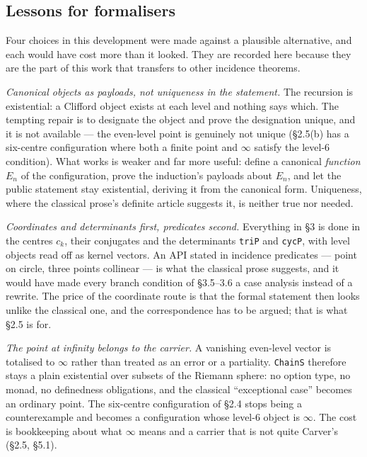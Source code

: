 \documentclass[11pt]{article}
\theoremstyle{definition}
\theoremstyle{remark}
\begin{document}
\hypertarget{lessons-for-formalisers}{%
\subsection{Lessons for formalisers}\label{lessons-for-formalisers}}

Four choices in this development were made against a plausible alternative, and each would have cost more
than it looked. They are recorded here because they are the part of this work that transfers to other
incidence theorems.

\emph{Canonical objects as payloads, not uniqueness in the statement.} The recursion is existential: a Clifford
object exists at each level and nothing says which. The tempting repair is to designate the object and
prove the designation unique, and it is not available --- the even-level point is genuinely not unique
(\S{}2.5(b) has a six-centre configuration where both a finite point and $\infty$ satisfy the level-6 condition).
What works is weaker and far more useful: define a canonical \emph{function} \(E_n\) of the configuration, prove
the induction's payloads about \(E_n\), and let the public statement stay existential, deriving it from the
canonical form. Uniqueness, where the classical prose's definite article suggests it, is neither true nor
needed.

\emph{Coordinates and determinants first, predicates second.} Everything in \S{}3 is done in the centres \(c_k\),
their conjugates and the determinants \texttt{triP} and \texttt{cycP}, with level objects read off as kernel vectors. An
API stated in incidence predicates --- point on circle, three points collinear --- is what the classical prose
suggests, and it would have made every branch condition of \S{}3.5--3.6 a case analysis instead of a rewrite.
The price of the coordinate route is that the formal statement then looks unlike the classical one, and
the correspondence has to be argued; that is what \S{}2.5 is for.

\emph{The point at infinity belongs to the carrier.} A vanishing even-level vector is totalised to $\infty$ rather
than treated as an error or a partiality. \texttt{ChainS} therefore stays a plain existential over subsets of the
Riemann sphere: no option type, no monad, no definedness obligations, and the classical ``exceptional case''
becomes an ordinary point. The six-centre configuration of \S{}2.4 stops being a counterexample and becomes a
configuration whose level-6 object is $\infty$. The cost is bookkeeping about what $\infty$ means and a carrier that is
not quite Carver's (\S{}2.5, \S{}5.1).
\end{document}

